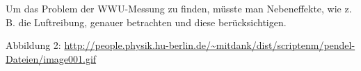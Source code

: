 \documentclass[11pt,a4paper,titlepage, ngerman]{article}
\begin{document}
		Um das Problem der WWU-Messung zu finden, müsste man Nebeneffekte, wie z. B. die Luftreibung, genauer betrachten und diese berücksichtigen.
		
		
		\newpage
		
		\begin{thebibliography}{9}		
			\item[Abbildung 2:] \url{http://people.physik.hu-berlin.de/~mitdank/dist/scriptenm/pendel-Dateien/image001.gif}			
		\end{thebibliography}	
			
\end{document}
